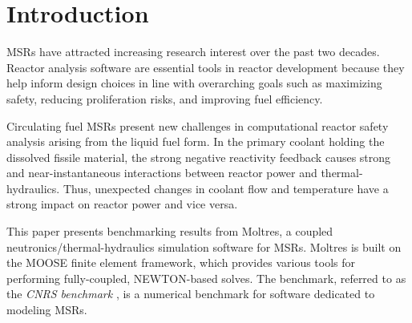 \section{Introduction}

\glspl{MSR} have attracted increasing research interest over the past two
decades. Reactor analysis software are essential tools in reactor development
because they help inform design choices in line with overarching goals such as
maximizing safety, reducing proliferation risks, and improving fuel
efficiency.

Circulating fuel \glspl{MSR} present new challenges in computational reactor
safety analysis arising from the liquid fuel form. In the primary coolant
holding the dissolved fissile material, the strong negative reactivity feedback
causes strong and near-instantaneous interactions between reactor power and
thermal-hydraulics. Thus, unexpected changes in coolant flow and temperature
have a strong impact on reactor power and vice versa.

This paper presents benchmarking results from Moltres, a coupled
neutronics/thermal-hydraulics simulation software for \glspl{MSR}. Moltres is
built on the \gls{MOOSE} \cite{gaston_physics-based_2015} finite element
framework, which provides various tools for performing fully-coupled,
NEWTON-based solves. The benchmark, referred to as the \textit{CNRS benchmark}
\cite{tiberga_results_2020}, is a numerical benchmark for software dedicated to
modeling \glspl{MSR}.
